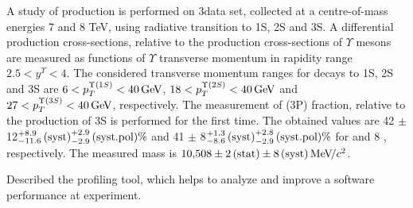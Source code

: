 A study of \chib production is performed on 3\invfb data set, collected
at a centre-of-mass energies 7 and 8 TeV, using \chib radiative transition to
\Y1S, \Y2S and \Y3S. A differential
production cross-sections, relative to the production cross-sections of
$\Upsilon$ mesons are measured as functions of $\Upsilon$ transverse momentum
in rapidity range $2.5 < y^{\Upsilon} < 4$. The considered transverse momentum
ranges for decays to \Y1S, \Y2S and \Y3S are $6<p_T^{\Y1S}<40\gev$,
$18<p_T^{\Y2S}<40\gev$ and $27<p_T^{\Y3S}<40\gev$, respectively. The measurement of
\chib(3P) fraction, relative to the production  of \Y3S  is performed for the first time.
The obtained values are 42 $\pm$
12\stat${}^{+8.9}_{-11.6}\mathrm{\,(syst)}^{+2.9}_{-2.9}\mathrm{\,(syst.pol)} \%$ and 41 $\pm$
8\stat${}^{+1.3}_{-8.6}\mathrm{\,(syst)}^{+2.8}_{-2.9}\mathrm{\,(syst.pol)} \%$ for  and 8 \tev,
respectively. The measured \chiboneThreeP mass is $10{,}508 \pm 2\mathrm{\,(stat)} \pm
8\mathrm{\,(syst)} {\mathrm{\,Me\kern -0.1em V\!/}c^2}$.

Described the profiling tool, which helps to analyze and improve a software
performance at \lhcb experiment.

